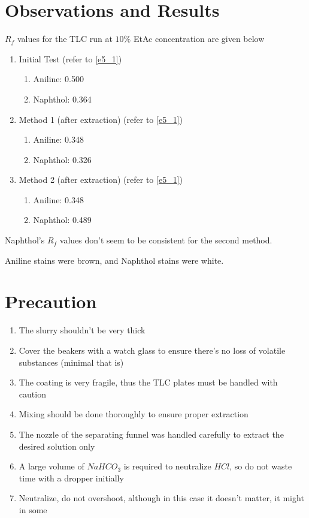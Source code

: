 \section{Observations and Results}
	$R_f$ values for the TLC run at $10\%$ EtAc concentration are given below
	\begin{enumerate}
		\item Initial Test (refer to \autoref{e5_1})
			\begin{enumerate}
				\item Aniline: 0.500
				\item Naphthol: 0.364
			\end{enumerate}
		\item Method 1 (after extraction) (refer to \autoref{e5_1})
			\begin{enumerate}
				\item Aniline: 0.348
				\item Naphthol: 0.326
			\end{enumerate}		
		\item Method 2 (after extraction) (refer to \autoref{e5_1})
			\begin{enumerate}
				\item Aniline: 0.348
				\item Naphthol: 0.489
			\end{enumerate}


	\end{enumerate}
	Naphthol's $R_f$ values don't seem to be consistent for the second method.
	\par
	Aniline stains were brown, and Naphthol stains were white.
\section{Precaution}
	\begin{enumerate}
		\item The slurry shouldn't be very thick
		\item Cover the beakers with a watch glass to ensure there's no loss of volatile substances (minimal that is)
		\item The coating is very fragile, thus the TLC plates must be handled with caution
		\item Mixing should be done thoroughly to ensure proper extraction
		\item The nozzle of the separating funnel was handled carefully to extract the desired solution only
		\item A large volume of $NaHCO_3$ is required to neutralize $HCl$, so do not waste time with a dropper initially
		\item Neutralize, do not overshoot, although in this case it doesn't matter, it might in some
	\end{enumerate}

